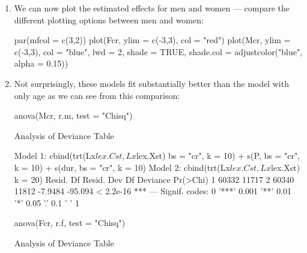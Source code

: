 \begin{enumerate}[resume]

\item We can now plot the estimated effects for men and women ---
  compare the different plotting options between men and women:
\begin{Schunk}
\begin{Sinput}
 par(mfcol = c(3,2))
 plot(Fcr, ylim = c(-3,3), col = "red")
 plot(Mcr, ylim = c(-3,3), col = "blue",
           lwd = 2, shade = TRUE, shade.col = adjustcolor("blue", alpha = 0.15))
\end{Sinput}
\end{Schunk}


\item Not surprisingly, these models fit substantially better than the
  model with only age as we can see from this comparison:
\begin{Schunk}
\begin{Sinput}
 anova(Mcr, r.m, test = "Chisq")
\end{Sinput}
\begin{Soutput}
Analysis of Deviance Table

Model 1: cbind(trt(Lx$lex.Cst, Lx$lex.Xst) %in% trnam, Lx$lex.dur) ~ s(A, 
    bs = "cr", k = 10) + s(P, bs = "cr", k = 10) + s(dur, bs = "cr", 
    k = 10)
Model 2: cbind(trt(Lx$lex.Cst, Lx$lex.Xst) %in% trnam, Lx$lex.dur) ~ s(A, 
    k = 20)
  Resid. Df Resid. Dev      Df Deviance  Pr(>Chi)    
1     60332      11717                               
2     60340      11812 -7.9484  -95.094 < 2.2e-16 ***
---
Signif. codes:  0 '***' 0.001 '**' 0.01 '*' 0.05 '.' 0.1 ' ' 1
\end{Soutput}
\begin{Sinput}
 anova(Fcr, r.f, test = "Chisq")
\end{Sinput}
\begin{Soutput}
Analysis of Deviance Table


\end{Soutput}
\end{Schunk}
\end{enumerate}

